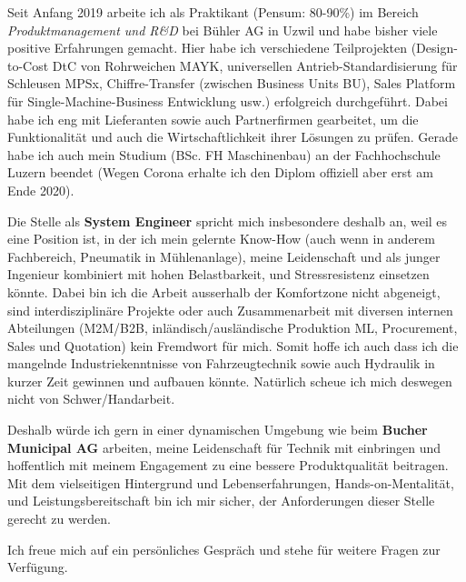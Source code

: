 \documentclass[11pt, a4paper]{awesome-cv}
\newcommand{\companyName}{Bucher Municipal AG}
\newcommand{\jobPosition}{System Engineer}
\begin{document}
\makecvheader

\makelettertitle

\begin{cvletter}
	
Seit Anfang 2019 arbeite ich als Praktikant (Pensum: 80-90\%) im Bereich \textit{Produktmanagement und R\&D} bei Bühler AG in Uzwil und habe bisher viele positive Erfahrungen gemacht. Hier habe ich verschiedene Teilprojekten (Design-to-Cost DtC von Rohrweichen MAYK, universellen Antrieb-Standardisierung für Schleusen MPSx, Chiffre-Transfer (zwischen Business Units BU), Sales Platform für Single-Machine-Business Entwicklung usw.) erfolgreich durchgeführt. Dabei habe ich eng mit Lieferanten sowie auch Partnerfirmen gearbeitet, um die Funktionalität und auch die Wirtschaftlichkeit ihrer Lösungen zu prüfen. Gerade habe ich auch mein Studium (BSc. FH Maschinenbau) an der Fachhochschule Luzern beendet (Wegen Corona erhalte ich den Diplom offiziell aber erst am Ende 2020).

Die Stelle als \textbf{\jobPosition} spricht mich insbesondere deshalb an, weil es eine Position ist, in der ich mein gelernte Know-How (auch wenn in anderem Fachbereich, Pneumatik in Mühlenanlage), meine Leidenschaft und als junger Ingenieur kombiniert mit hohen Belastbarkeit, und Stressresistenz einsetzen könnte. Dabei bin ich die Arbeit ausserhalb der Komfortzone nicht abgeneigt, sind interdisziplinäre Projekte oder auch Zusammenarbeit mit diversen internen Abteilungen (M2M/B2B, inländisch/ausländische Produktion ML, Procurement, Sales und Quotation) kein Fremdwort für mich. Somit hoffe ich auch dass ich die mangelnde Industriekenntnisse von Fahrzeugtechnik sowie auch Hydraulik in kurzer Zeit gewinnen und aufbauen könnte. Natürlich scheue ich mich deswegen nicht von Schwer/Handarbeit.

Deshalb würde ich gern in einer dynamischen Umgebung wie beim \textbf{\companyName} arbeiten, meine Leidenschaft für Technik mit einbringen und hoffentlich mit meinem Engagement zu eine bessere Produktqualität beitragen. Mit dem vielseitigen Hintergrund und Lebenserfahrungen, Hands-on-Mentalität, und Leistungsbereitschaft bin ich mir sicher, der Anforderungen dieser Stelle gerecht zu werden. 

Ich freue mich auf ein persönliches Gespräch und stehe für weitere Fragen zur Verfügung.

\end{cvletter}

\makeletterclosing
\end{document}
